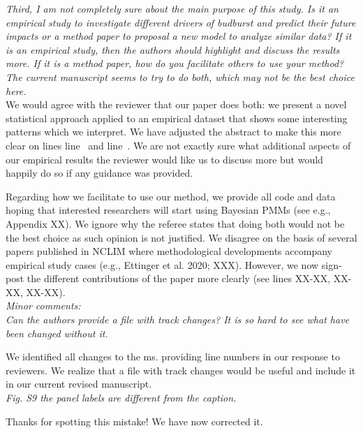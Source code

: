 \documentclass[11pt]{article}
\newcommand{\lr}[1]{line~\lineref{#1}}
\begin{document}
\emph{Third, I am not completely sure about the main purpose of this study. Is it an empirical study to investigate different drivers of budburst and predict their future impacts or a method paper to proposal a new model to analyze similar data? If it is an empirical study, then the authors should highlight and discuss the results more. If it is a method paper, how do you facilitate others to use your method? The current manuscript seems to try to do both, which may not be the best choice here.}\\

We would agree with the reviewer that our paper does both: we present a novel statistical approach applied to an empirical dataset that shows some interesting patterns which we interpret. We have adjusted the abstract to make this more clear on lines \lr{whatisyourpaper1} and \lr{whatisyourpaper2}. We are not exactly sure what additional aspects of our empirical results the reviewer would like us to discuss more but would happily do so if any guidance was provided. 

Regarding how we facilitate to use our method, we provide all code and data hoping that interested researchers will start using Bayesian PMMs (see e.g., Appendix XX). We ignore why the referee states that doing both would not be the best choice as such opinion is not justified. We disagree on the basis of several papers published in NCLIM where methodological developments accompany empirical study cases (e.g., Ettinger et al. 2020; XXX). However, we now sign-post the different contributions of the paper more clearly (see lines XX-XX, XX-XX, XX-XX).\\


\emph{Minor comments:}\\
\emph{Can the authors provide a file with track changes? It is so hard to see what have been changed without it.}

We identified all changes to the ms. providing line numbers in our response to reviewers. We realize that a file with track changes would be useful and include it in our current revised manuscript.\\


\emph{Fig. S9 the panel labels are different from the caption.}


Thanks for spotting this mistake! We have now corrected it.\\




\end{document}
